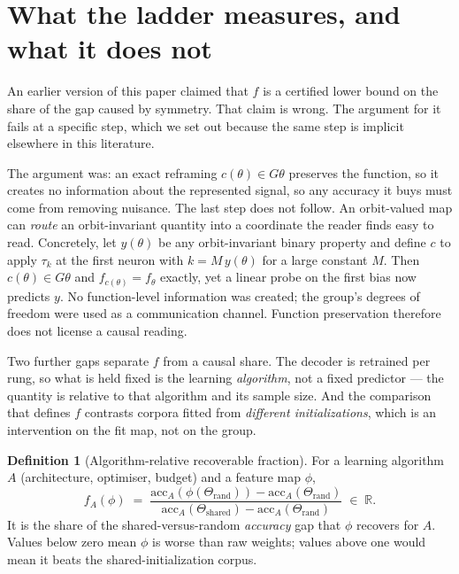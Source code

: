 \documentclass[10pt,twocolumn,letterpaper]{article}
\theoremstyle{definition}
\newtheorem{definition}[theorem]{Definition}
\newcommand{\R}{\mathbb{R}}
\begin{document}
\section{What the ladder measures, and what it does not}\label{sec:bounds}

An earlier version of this paper claimed that $f$ is a certified lower bound on the share of the
gap caused by symmetry. That claim is wrong. The argument for it fails at a specific step, which we set out
because the same step is implicit elsewhere in this literature.

The argument was: an exact reframing $c(\theta) \in G\theta$ preserves the function, so it creates
no information about the represented signal, so any accuracy it buys must come from removing
nuisance. The last step does not follow. An orbit-valued map can \emph{route} an orbit-invariant
quantity into a coordinate the reader finds easy to read. Concretely, let $y(\theta)$ be any
orbit-invariant binary property and define $c$ to apply $\tau_{k}$ at the first neuron with
$k = M\,y(\theta)$ for a large constant $M$. Then $c(\theta) \in G\theta$ and
$f_{c(\theta)} = f_\theta$ exactly, yet a linear probe on the first bias now predicts $y$. No
function-level information was created; the group's degrees of freedom were used as a
communication channel. Function preservation therefore does not license a causal reading.

Two further gaps separate $f$ from a causal share. The decoder is retrained per rung, so what is
held fixed is the learning \emph{algorithm}, not a fixed predictor --- the quantity is relative to
that algorithm and its sample size. And the comparison that defines $f$ contrasts corpora fitted
from \emph{different initializations}, which is an intervention on the fit map, not on the group.

\begin{definition}[Algorithm-relative recoverable fraction]\label{def:f}
For a learning algorithm $A$ (architecture, optimiser, budget) and a feature map $\phi$,
\begin{equation}
f_A(\phi) \;=\; \frac{\mathrm{acc}_A(\phi(\Theta_{\mathrm{rand}})) - \mathrm{acc}_A(\Theta_{\mathrm{rand}})}
{\mathrm{acc}_A(\Theta_{\mathrm{shared}}) - \mathrm{acc}_A(\Theta_{\mathrm{rand}})} \;\in\; \R .
\end{equation}
It is the share of the shared-versus-random \emph{accuracy} gap that $\phi$ recovers for $A$.
Values below zero mean $\phi$ is worse than raw weights; values above one would mean it beats the
shared-initialization corpus.
\end{definition}
\end{document}
